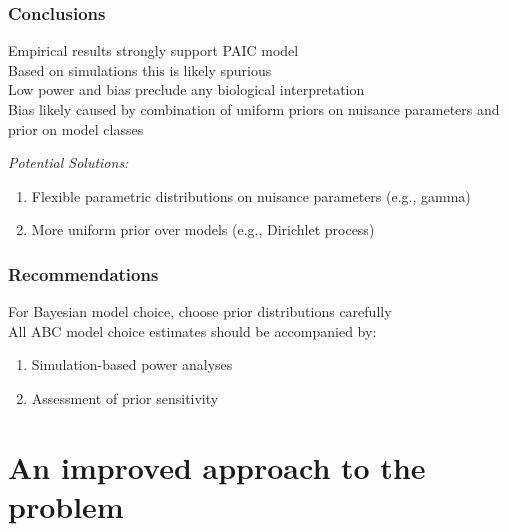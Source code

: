 \begin{frame}
    \frametitle{Conclusions}
    Empirical results strongly support PAIC model \\
    \bigskip
    Based on simulations this is likely spurious \\
    \bigskip
    Low power and bias preclude any biological interpretation \\
    \bigskip
    Bias likely caused by combination of uniform priors on nuisance parameters
    and prior on model classes \\
    \bigskip
    \begin{block}{\it Potential Solutions:}
        \begin{enumerate}
            \item Flexible parametric distributions on nuisance parameters (e.g., gamma)
            \item More uniform prior over models (e.g., Dirichlet process)
        \end{enumerate}
    \end{block}
\end{frame}

\begin{frame}
    \frametitle{Recommendations}
    For Bayesian model choice, choose prior distributions carefully\\
    \bigskip
    All ABC model choice estimates should be accompanied by:
    \begin{enumerate}
        \item Simulation-based power analyses
        \item Assessment of prior sensitivity
    \end{enumerate}
    \medskip
\end{frame}

\section{An improved approach to the problem}


